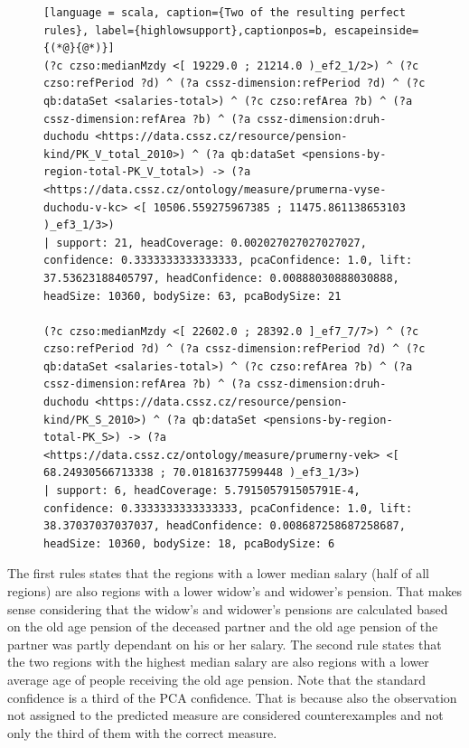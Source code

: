 \begin{figure}[h]
\begin{lstlisting}[language = scala, caption={Two of the resulting perfect rules}, label={highlowsupport},captionpos=b, escapeinside={(*@}{@*)}]
(?c czso:medianMzdy <[ 19229.0 ; 21214.0 )_ef2_1/2>) ^ (?c czso:refPeriod ?d) ^ (?a cssz-dimension:refPeriod ?d) ^ (?c qb:dataSet <salaries-total>) ^ (?c czso:refArea ?b) ^ (?a cssz-dimension:refArea ?b) ^ (?a cssz-dimension:druh-duchodu <https://data.cssz.cz/resource/pension-kind/PK_V_total_2010>) ^ (?a qb:dataSet <pensions-by-region-total-PK_V_total>) -> (?a <https://data.cssz.cz/ontology/measure/prumerna-vyse-duchodu-v-kc> <[ 10506.559275967385 ; 11475.861138653103 )_ef3_1/3>) 
| support: 21, headCoverage: 0.002027027027027027, confidence: 0.3333333333333333, pcaConfidence: 1.0, lift: 37.53623188405797, headConfidence: 0.00888030888030888, headSize: 10360, bodySize: 63, pcaBodySize: 21

(?c czso:medianMzdy <[ 22602.0 ; 28392.0 ]_ef7_7/7>) ^ (?c czso:refPeriod ?d) ^ (?a cssz-dimension:refPeriod ?d) ^ (?c qb:dataSet <salaries-total>) ^ (?c czso:refArea ?b) ^ (?a cssz-dimension:refArea ?b) ^ (?a cssz-dimension:druh-duchodu <https://data.cssz.cz/resource/pension-kind/PK_S_2010>) ^ (?a qb:dataSet <pensions-by-region-total-PK_S>) -> (?a <https://data.cssz.cz/ontology/measure/prumerny-vek> <[ 68.24930566713338 ; 70.01816377599448 )_ef3_1/3>) 
| support: 6, headCoverage: 5.791505791505791E-4, confidence: 0.3333333333333333, pcaConfidence: 1.0, lift: 38.37037037037037, headConfidence: 0.008687258687258687, headSize: 10360, bodySize: 18, pcaBodySize: 6
\end{lstlisting}
\end{figure}

The first rules states that the regions with a lower median salary (half of all regions) are also regions with a lower widow's and widower's pension. That makes sense considering that the widow's and widower's pensions are calculated based on the old age pension of the deceased partner and the old age pension of the partner was partly dependant on his or her salary. The second rule states that the two regions with the highest median salary are also regions with a lower average age of people receiving the old age pension. Note that the standard confidence is a third of the PCA confidence. That is because also the observation not assigned to the predicted measure are considered counterexamples and not only the third of them with the correct measure.

